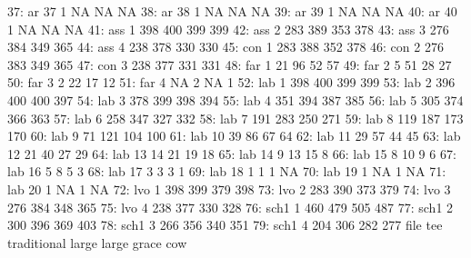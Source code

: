 \begin{Schunk}
\begin{Soutput}
37:   ar  37           1    NA          NA  NA
38:   ar  38           1    NA          NA  NA
39:   ar  39           1    NA          NA  NA
40:   ar  40           1    NA          NA  NA
41:  ass   1         398   400         399 399
42:  ass   2         283   389         353 378
43:  ass   3         276   384         349 365
44:  ass   4         238   378         330 330
45:  con   1         283   388         352 378
46:  con   2         276   383         349 365
47:  con   3         238   377         331 331
48:  far   1          21    96          52  57
49:  far   2           5    51          28  27
50:  far   3           2    22          17  12
51:  far   4          NA     2          NA   1
52:  lab   1         398   400         399 399
53:  lab   2         396   400         400 397
54:  lab   3         378   399         398 394
55:  lab   4         351   394         387 385
56:  lab   5         305   374         366 363
57:  lab   6         258   347         327 332
58:  lab   7         191   283         250 271
59:  lab   8         119   187         173 170
60:  lab   9          71   121         104 100
61:  lab  10          39    86          67  64
62:  lab  11          29    57          44  45
63:  lab  12          21    40          27  29
64:  lab  13          14    21          19  18
65:  lab  14           9    13          15   8
66:  lab  15           8    10           9   6
67:  lab  16           5     8           5   3
68:  lab  17           3     3           3   1
69:  lab  18           1     1           1  NA
70:  lab  19           1    NA           1  NA
71:  lab  20           1    NA           1  NA
72:  lvo   1         398   399         379 398
73:  lvo   2         283   390         373 379
74:  lvo   3         276   384         348 365
75:  lvo   4         238   377         330 328
76: sch1   1         460   479         505 487
77: sch1   2         300   396         369 403
78: sch1   3         266   356         340 351
79: sch1   4         204   306         282 277
    file tee traditional large large grace cow
\end{Soutput}
\end{Schunk}

